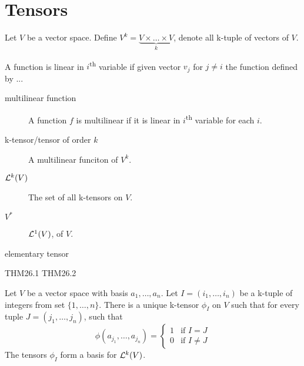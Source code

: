 \section{Tensors}

Let $V$ be a vector space. Define $V^k=\underbrace{V\times\ldots\times V}_{k}$, denote all k-tuple of vectors of $V$.

A function is linear in $i$\textsuperscript{th} variable if given vector $v_j$ for $j\neq i$ the function defined by ...\TODO

\begin{description}
\item[multilinear function]
A function $f$ is multilinear if it is linear in $i$\textsuperscript{th} variable for each $i$.
\item[k-tensor/tensor of order $k$] A multilinear funciton of $V^k$.
\item[${\mathcal L}^k(V)$] The set of all k-tensors on $V$.
\item[$V^*$] ${\mathcal L}^1(V)$,  of $V$.
\item[elementary tensor]
\end{description}

\TODO
THM26.1
THM26.2


Let $V$ be a vector space with basis $a_1, \ldots, a_n$.
Let $I=(i_1, \ldots, i_n)$ be a k-tuple of integers from set $\{1,\ldots, n\}$.
There is a unique k-tensor $\phi_I$ on $V$ such that for every tuple $J=(j_1, \ldots, j_n)$, such that
\[\phi(a_{j_1},\ldots,a_{j_n})=\begin{cases}1&\text{if }I=J\\0&\text{if }I\neq J\end{cases}\]
The tensors $\phi_I$ form a basis for ${\mathcal L}^k(V)$.